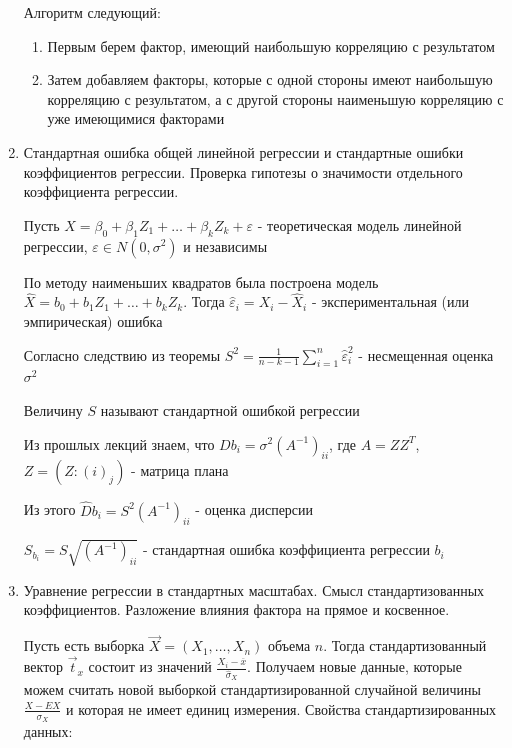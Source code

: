 \documentclass[12pt]{article}
\begin{document}
\begin{enumerate}
    \smallvspace

    Алгоритм следующий: 

    \begin{enumerate}
        \item Первым берем фактор, имеющий наибольшую корреляцию с результатом
        \item Затем добавляем факторы, которые с одной стороны имеют наибольшую корреляцию с результатом, а с другой стороны наименьшую корреляцию с уже имеющимися факторами
    \end{enumerate}

    \item Стандартная ошибка общей линейной регрессии и стандартные ошибки коэффициентов регрессии. Проверка гипотезы о значимости отдельного коэффициента регрессии.

    Пусть $X = \beta_0 + \beta_1 Z_1 + \dots + \beta_k Z_k + \varepsilon$ - теоретическая модель линейной регрессии, $\varepsilon \in N(0, \sigma^2)$ и независимы

    По методу наименьших квадратов была построена модель $\hat X = b_0 + b_1 Z_1 + \dots + b_k Z_k$. Тогда $\hat \varepsilon_i = X_i - \hat X_i$ - экспериментальная (или эмпирическая) ошибка

    Согласно следствию из теоремы $S^2 = \frac{1}{n - k - 1} \sum_{i = 1}^n \hat \varepsilon_i^2$ - несмещенная оценка $\sigma^2$

    \Def Величину $S$ называют стандартной ошибкой регрессии 

    Из прошлых лекций знаем, что $D b_i = \sigma^2 (A^{-1})_{ii}$, где $A = Z Z^T$, $Z = (Z:{(i)}_j)$ - матрица плана

    Из этого $\hat D b_i = S^2 (A^{-1})_{ii}$ - оценка дисперсии

    \Def $S_{b_i} = S \sqrt{(A^{-1})_{ii}}$ - стандартная ошибка коэффициента регрессии $b_i$

    \item Уравнение регрессии в стандартных масштабах. Смысл стандартизованных коэффициентов. Разложение влияния фактора на прямое и косвенное.

    Пусть есть выборка $\vec X = (X_1, \dots, X_n)$ объема $n$. Тогда стандартизованный вектор $\vec t_x$ состоит из значений $\frac{X_i - \overline{x}}{\hat \sigma_X}$. Получаем новые данные, которые можем считать новой выборкой стандартизированной случайной величины $\frac{X - EX}{\sigma_X}$ и которая не имеет единиц измерения. Свойства стандартизированных данных:


\end{enumerate}
\end{document}
